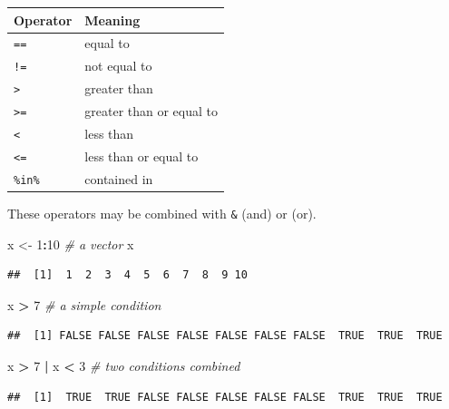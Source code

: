 \documentclass[]{book}
\newenvironment{Shaded}{\begin{snugshade}}{\end{snugshade}}
\newcommand{\CommentTok}[1]{\textcolor[rgb]{0.56,0.35,0.01}{\textit{#1}}}
\newcommand{\DecValTok}[1]{\textcolor[rgb]{0.00,0.00,0.81}{#1}}
\newcommand{\KeywordTok}[1]{\textcolor[rgb]{0.13,0.29,0.53}{\textbf{#1}}}
\newcommand{\NormalTok}[1]{#1}
\newcommand{\OperatorTok}[1]{\textcolor[rgb]{0.81,0.36,0.00}{\textbf{#1}}}
\newcommand{\StringTok}[1]{\textcolor[rgb]{0.31,0.60,0.02}{#1}}
\begin{document}
\begin{longtable}[]{@{}ll@{}}
\toprule
Operator & Meaning\tabularnewline
\midrule
\endhead
\texttt{==} & equal to\tabularnewline
\texttt{!=} & not equal to\tabularnewline
\texttt{\textgreater{}} & greater than\tabularnewline
\texttt{\textgreater{}=} & greater than or equal to\tabularnewline
\texttt{\textless{}} & less than\tabularnewline
\texttt{\textless{}=} & less than or equal to\tabularnewline
\texttt{\%in\%} & contained in\tabularnewline
\bottomrule
\end{longtable}

These operators may be combined with \texttt{\&} (and) or \texttt{\textbar{}} (or).

\begin{Shaded}
\begin{Highlighting}[]
\NormalTok{x <-}\StringTok{ }\DecValTok{1}\OperatorTok{:}\DecValTok{10} \CommentTok{# a vector}
\NormalTok{x}
\end{Highlighting}
\end{Shaded}

\begin{verbatim}
##  [1]  1  2  3  4  5  6  7  8  9 10
\end{verbatim}

\begin{Shaded}
\begin{Highlighting}[]
\NormalTok{x }\OperatorTok{>}\StringTok{ }\DecValTok{7} \CommentTok{# a simple condition}
\end{Highlighting}
\end{Shaded}

\begin{verbatim}
##  [1] FALSE FALSE FALSE FALSE FALSE FALSE FALSE  TRUE  TRUE  TRUE
\end{verbatim}

\begin{Shaded}
\begin{Highlighting}[]
\NormalTok{x }\OperatorTok{>}\StringTok{ }\DecValTok{7} \OperatorTok{|}\StringTok{ }\NormalTok{x }\OperatorTok{<}\StringTok{ }\DecValTok{3} \CommentTok{# two conditions combined}
\end{Highlighting}
\end{Shaded}

\begin{verbatim}
##  [1]  TRUE  TRUE FALSE FALSE FALSE FALSE FALSE  TRUE  TRUE  TRUE
\end{verbatim}

\begin{Shaded}
\end{Shaded}
\end{document}

